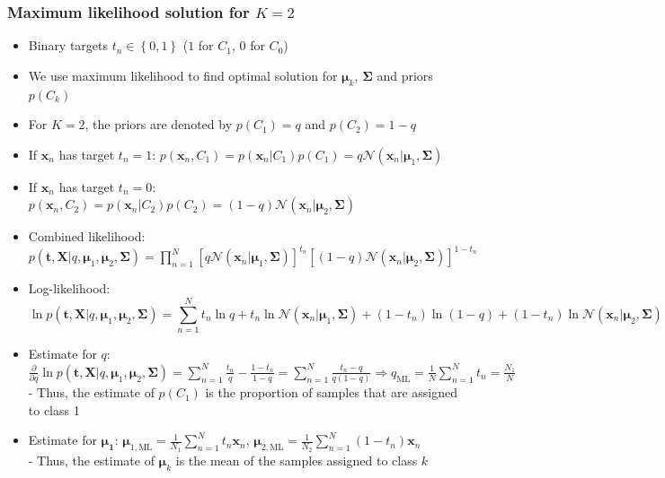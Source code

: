 \subsubsection{Maximum likelihood solution for $K=2$}
\begin{itemize}
	\item Binary targets $t_n\in\left\{0,1\right\}$ ($1$ for $C_1$, $0$ for $C_0$)
	\item We use maximum likelihood to find optimal solution for $\bm{\mu}_k$, $\bm{\Sigma}$ and priors $p\left(C_k\right)$
	\item For $K=2$, the priors are denoted by $p\left(C_1\right) = q$ and $p\left(C_2\right) = 1-q$
	\item If $\bm{x}_n$ has target $t_n=1$: $p\left(\bm{x}_n, C_1\right) = p\left(\bm{x}_n|C_1\right)p\left(C_1\right) =q\mathcal{N}\left(\bm{x}_n|\bm{\mu}_1, \bm{\Sigma}\right)$
	\item If $\bm{x}_n$ has target $t_n=0$: $p\left(\bm{x}_n, C_2\right) = p\left(\bm{x}_n|C_2\right)p\left(C_2\right) =(1-q)\mathcal{N}\left(\bm{x}_n|\bm{\mu}_2, \bm{\Sigma}\right)$
	\item Combined likelihood: $p\left(\bm{t}, \bm{X}|q,\bm{\mu}_1,\bm{\mu}_2,\bm{\Sigma}\right) = \prod\limits_{n=1}^{N} \left[q\mathcal{N}\left(\bm{x}_n|\bm{\mu}_1, \bm{\Sigma}\right)\right]^{t_n}\left[(1-q)\mathcal{N}\left(\bm{x}_n|\bm{\mu}_2, \bm{\Sigma}\right)\right]^{1-t_n}$
	\item Log-likelihood: $$\ln p\left(\bm{t}, \bm{X}|q,\bm{\mu}_1,\bm{\mu}_2,\bm{\Sigma}\right) = \sum\limits_{n=1}^{N}t_n \ln q + t_n \ln \mathcal{N}\left(\bm{x}_n|\bm{\mu}_1, \bm{\Sigma}\right) + (1 - t_n) \ln \left(1 - q\right) + \left(1 - t_n\right) \ln \mathcal{N}\left(\bm{x}_n|\bm{\mu}_2, \bm{\Sigma}\right) $$
	\item Estimate for $q$: $\frac{\partial}{\partial q} \ln p\left(\bm{t}, \bm{X}|q,\bm{\mu}_1,\bm{\mu}_2,\bm{\Sigma}\right) = \sum\limits_{n=1}^{N} \frac{t_n}{q} - \frac{1 - t_n}{1 - q} = \sum\limits_{n=1}^{N} \frac{t_n - q}{q\left(1 - q\right)} \Rightarrow q_{\text{ML}} = \frac{1}{N}\sum\limits_{n=1}^{N} t_n = \frac{N_1}{N}$\\
	- Thus, the estimate of $p(C_1)$ is the proportion of samples that are assigned to class 1
	\item Estimate for $\bm{\mu_1}$: $\bm{\mu}_{1,\text{ML}} = \frac{1}{N_1}\sum\limits_{n=1}^{N} t_n \bm{x}_n$, $\bm{\mu}_{2,\text{ML}} = \frac{1}{N_2}\sum\limits_{n=1}^{N} \left(1-t_n\right) \bm{x}_n$\\
	- Thus, the estimate of $\bm{\mu}_k$ is the mean of the samples assigned to class $k$

\end{itemize}
